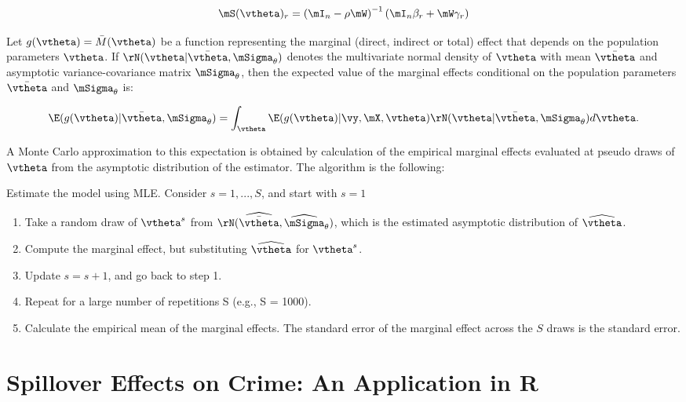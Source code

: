 \begin{equation*}
\mS(\vtheta)_r = \left(\mI_n - \rho\mW\right)^{-1}\left(\mI_n\beta_r + \mW\gamma_r\right)
\end{equation*}


Let $g(\vtheta)= \bar{M}(\vtheta)$ be a function representing the marginal (direct, indirect or total) effect that depends on the population parameters $\vtheta$. If $\rN(\vtheta|\bar{\vtheta}, \mSigma_{\theta})$ denotes the multivariate normal density of $\vtheta$ with mean $\bar{\vtheta}$ and asymptotic variance-covariance matrix $\mSigma_{\theta}$, then the expected value of the marginal effects conditional on the population parameters $\bar{\vtheta}$ and $\mSigma_{\theta}$ is:

\begin{equation}
\E(g(\vtheta)|\bar{\vtheta}, \mSigma_{\theta}) = \int_{\vtheta}\E(g(\vtheta)|\vy, \mX, \vtheta)\rN(\vtheta|\bar{\vtheta}, \mSigma_{\theta})d\vtheta. 
\end{equation}

A Monte Carlo approximation to this expectation is obtained by calculation of the empirical marginal effects evaluated at pseudo draws of $\vtheta$ from the asymptotic distribution of the estimator. The algorithm is the following:

\begin{algorithm}
Estimate the model using MLE. Consider $s = 1, ..., S$, and start with $s = 1$
\begin{enumerate}
  \item Take a random draw of $\vtheta^{s}$ from $\rN(\widehat{\bar{\vtheta}}, \widehat{\mSigma}_{\theta})$, which is the estimated asymptotic distribution of $\widehat{\vtheta}$. 
 \item Compute the marginal effect, but substituting  $\widehat{\vtheta}$ for $\vtheta^s$. 
 \item Update $s = s + 1$, and go back to step 1. 
 \item Repeat for a large number of repetitions S (e.g., S = 1000).  
 \item Calculate the empirical mean of the marginal effects. The standard error of the marginal effect across the $S$ draws is the standard error. 
\end{enumerate}
\end{algorithm}


\section{Spillover Effects on Crime: An Application in R}\label{sec:Anselin-example}


